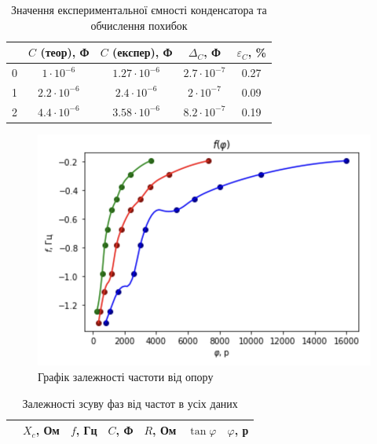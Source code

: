\documentclass[a4paper,12pt]{article}
\begin{document}
\begin{justify}
    \begin{table}[htp]
    \begin{flushright}
		\caption{Значення експериментальної ємності конденсатора та обчислення похибок }
	\end{flushright}
    \centering  
\begin{tabular}{|c|c|c|c|c|}
\hline
  & $C$ (теор), Ф     & $C$ (експер), Ф    & $\Delta_C$, Ф & $\varepsilon_C$, \% \\ \hline
0 & $1\cdot10^{-6}$   & $1.27\cdot10^{-6}$ & $2.7\cdot10^{-7}$    & 0.27                 \\ \hline
1 & $2.2\cdot10^{-6}$ & $2.4\cdot10^{-6}$  & $2\cdot10^{-7}$      & 0.09                 \\ \hline
2 & $4.4\cdot10^{-6}$ & $3.58\cdot10^{-6}$ & $8.2\cdot10^{-7}$    & 0.19                 \\ \hline
\end{tabular}
\end{table}
\begin{figure}[h!]
		\begin{center}
			\includegraphics[scale=0.8]{media/graph15}
		\end{center}
		\caption{Графік залежності частоти від опору}
		\label{Picture_е}
	\end{figure}
\begin{table}[htp]
    \begin{flushright}
		\caption{Залежності зсуву фаз від частот в усіх даних }
	\end{flushright}
\centering
\begin{tabular}{|c|c|c|c|c|c|c|}
\hline
   & $X_c$, Ом & $f$, Гц & $C$, Ф & $R$, Ом & $\tan\varphi$ & $\varphi$, р \\ \hline

\end{tabular}
\end{table}
\end{justify}
\end{document}
